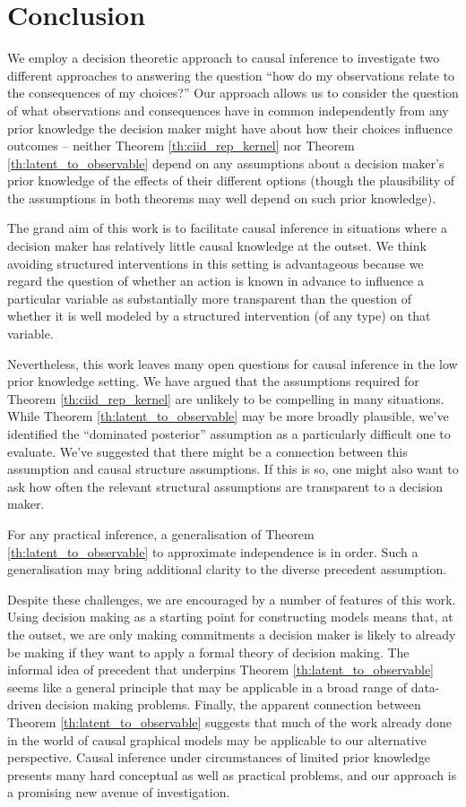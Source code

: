 \section{Conclusion}

We employ a decision theoretic approach to causal inference to investigate two different approaches to answering the question ``how do my observations relate to the consequences of my choices?'' Our approach allows us to consider the question of what observations and consequences have in common independently from any prior knowledge the decision maker might have about how their choices influence outcomes -- neither Theorem \ref{th:ciid_rep_kernel} nor Theorem \ref{th:latent_to_observable} depend on any assumptions about a decision maker's prior knowledge of the effects of their different options (though the plausibility of the assumptions in both theorems may well depend on such prior knowledge).

The grand aim of this work is to facilitate causal inference in situations where a decision maker has relatively little causal knowledge at the outset. We think avoiding structured interventions in this setting is advantageous because we regard the question of whether an action is known in advance to influence a particular variable as substantially more transparent than the question of whether it is well modeled by a structured intervention (of any type) on that variable.

Nevertheless, this work leaves many open questions for causal inference in the low prior knowledge setting. We have argued that the assumptions required for Theorem \ref{th:ciid_rep_kernel} are unlikely to be compelling in many situations. While Theorem \ref{th:latent_to_observable} may be more broadly plausible, we've identified the ``dominated posterior'' assumption as a particularly difficult one to evaluate. We've suggested that there might be a connection between this assumption and causal structure assumptions. If this is so, one might also want to ask how often the relevant structural assumptions are transparent to a decision maker.

For any practical inference, a generalisation of Theorem \ref{th:latent_to_observable} to approximate independence is in order. Such a generalisation may bring additional clarity to the diverse precedent assumption.

Despite these challenges, we are encouraged by a number of features of this work. Using decision making as a starting point for constructing models means that, at the outset, we are only making commitments a decision maker is likely to already be making if they want to apply a formal theory of decision making. The informal idea of precedent that underpins Theorem \ref{th:latent_to_observable} seems like a general principle that may be applicable in a broad range of data-driven decision making problems. Finally, the apparent connection between Theorem \ref{th:latent_to_observable} suggests that much of the work already done in the world of causal graphical models may be applicable to our alternative perspective. Causal inference under circumstances of limited prior knowledge presents many hard conceptual as well as practical problems, and our approach is a promising new avenue of investigation.